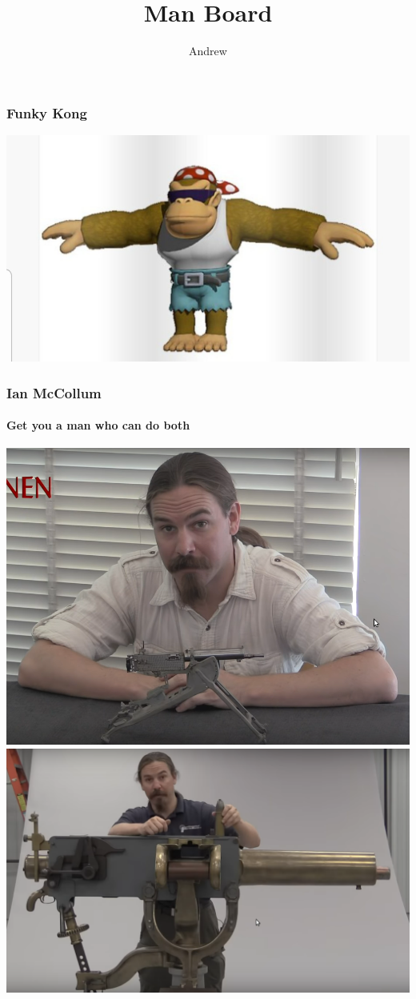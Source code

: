 \documentclass{beamer}
\title{Man Board}
\author{Andrew}
\begin{document}
\frame{\titlepage}

\begin{frame}
\frametitle{Funky Kong}
\includegraphics[height=\paperheight]{funky kong.jpg}
\end{frame}

\begin{frame}
	\frametitle{Ian McCollum}
		\framesubtitle{Get you a man who can do both}
	\vspace{1em}
	\includegraphics[scale=0.14]{ian 1.png}
	\includegraphics[scale=0.14]{ian 2.png}
\end{frame}
\end{document}
